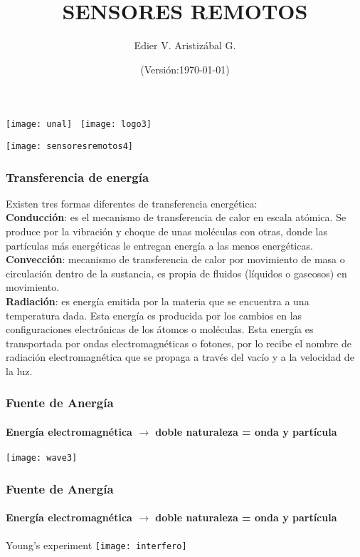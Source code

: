 \documentclass[]{beamer}
\title[Radiación Electromagnética]{SENSORES REMOTOS}
\author[Edier Aristizábal]{Edier V. Aristizábal G.}
\institute{\emph{evaristizabalg@unal.edu.co}}
\date{(Versión:\today)}
\begin{document}
\begin{frame}
\titlepage
\centering
	\texttt{[image: unal]}\hspace*{4.75cm}~%
   	\texttt{[image: logo3]} 
\end{frame}
\begin{frame}
\begin{center}
\texttt{[image: sensoresremotos4]}
\end{center}
\end{frame}
\begin{frame}
\frametitle{Transferencia de energía}
\justifying
\small{
Existen tres formas diferentes de transferencia energética:\\
\vfill
\textbf{Conducción}: es el mecanismo de transferencia de calor en escala atómica. Se produce por la vibración y  choque de unas moléculas con otras, donde las partículas más energéticas le entregan energía a las menos energéticas.\\
\vfill
\textbf{Convección}: mecanismo de transferencia de calor por movimiento de masa o circulación dentro de la sustancia, es propia de fluidos (líquidos o gaseosos) en movimiento.\\
\vfill 
\color{blue}
\textbf{Radiación}: es energía emitida por la materia que se encuentra a una temperatura dada. Esta energía es producida por los cambios en las configuraciones electrónicas de los átomos o moléculas. Esta energía es transportada por ondas electromagnéticas o fotones, por lo recibe el nombre de radiación electromagnética que se propaga a través del vacío y a la velocidad de la luz. 
}
\end{frame}
\begin{frame}
\frametitle{Fuente de Anergía}
\framesubtitle{Energía electromagnética $\rightarrow$ doble naturaleza = onda y partícula}
\begin{center}
\texttt{[image: wave3]}
\end{center}
\end{frame}
\begin{frame}
\frametitle{Fuente de Anergía}
\framesubtitle{Energía electromagnética $\rightarrow$ doble naturaleza = onda y partícula}
\begin{center}
Young's experiment
\texttt{[image: interfero]}
\end{center}
\end{frame}
\end{document}
